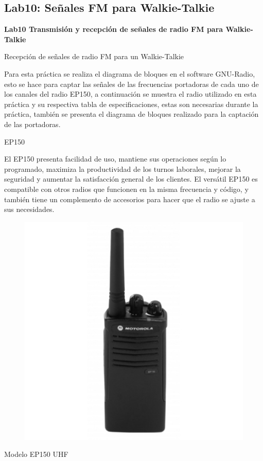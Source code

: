 \subsection{Lab10: Señales FM para Walkie-Talkie}
\begin{frame}{}



\bfseries{\textrm{\LARGE Lab10 \newline\Large Transmisión y recepción de \newline señales de radio FM para \newline Walkie-Talkie}}
\raggedright
\end{frame}

\begin{frame}{Recepción de señales de radio FM para un Walkie-Talkie}


Para esta práctica se realiza el diagrama de bloques en el software GNU-Radio, esto se hace para captar las señales de las frecuencias portadoras de cada uno de los canales del radio EP150, a continuación se muestra el radio utilizado en esta práctica y su respectiva tabla de especificaciones, estas son necesarias durante la práctica, también se presenta el diagrama de bloques realizado para la captación de las portadoras.
    
\end{frame}

\begin{frame}{EP150}

El EP150 presenta facilidad de uso, mantiene sus operaciones según lo programado, maximiza la productividad de los turnos laborales, mejorar la  seguridad y aumentar la satisfacción general de los clientes. El versátil EP150 es compatible con otros radios que funcionen en la misma frecuencia y código, y también tiene un complemento de accesorios para hacer que el radio se ajuste a sus necesidades.

\begin{figure}[H]
\centering
\vspace{-3mm}
\includegraphics[width=.3\textwidth]{parte3/lab10/pdf/lab10_1.pdf}
\end{figure}

\centering\tiny{Modelo EP150 UHF}

\end{frame}

